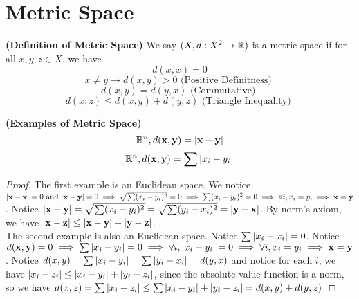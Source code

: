 \documentclass{report}
\begin{document}
\section{Metric Space}
\begin{definition}
\label{2.7.1}
\textbf{(Definition of Metric Space)} We say $(X,d:X^2\rightarrow \mathbb{R})$ is a metric space if for all $x,y,z \in X$, we have
\begin{equation}
d(x,x)=0 
\end{equation}
\begin{equation}
x\neq y\longrightarrow d(x,y)>0\text{ (Positive Definitness) }
\end{equation}
\begin{equation}
d(x,y)=d(y,x)\text{ (Commutative) }
\end{equation}
\begin{equation}
d(x,z)\leq d(x,y)+d(y,z)\text{ (Triangle Inequality) }
\end{equation}
\end{definition}
\begin{theorem}
\label{2.7.2}
\textbf{(Examples of Metric Space)} 
\begin{equation}
  \mathbb{R}^n,d(\textbf{x},\textbf{y})=|\textbf{x}-\textbf{y}|
\end{equation}
\begin{equation}
  \mathbb{R}^n,d(\textbf{x},\textbf{y})=\sum |x_i-y_i|
\end{equation}
\end{theorem}
\begin{proof}
  The first example is an Euclidean space. We notice $|\textbf{x}-\textbf{x}|=0\text{ and }|\textbf{x}-\textbf{y}|=0\implies \sqrt{\sum (x_i-y_i)^2}=0\implies \sum (x_i-y_i)^2=0\implies \forall i, x_i=y_i\implies \textbf{x}=\textbf{y} $. Notice $|\textbf{x}-\textbf{y}|=\sqrt{\sum (x_i-y_i)^2}=\sqrt{\sum (y_i-x_i)^2}=|\textbf{y}-\textbf{x}|$. By norm's axiom, we have $|\textbf{x}-\textbf{z}|\leq |\textbf{x}-\textbf{y}|+|\textbf{y}-\textbf{z}|$.\\

The second example is also an Euclidean space. Notice $\sum |x_i-x_i|=0$. Notice $d(\textbf{x},\textbf{y})=0\implies \sum |x_i-y_i|=0\implies \forall i,|x_i-y_i|=0\implies \forall i,x_i=y_i\implies \textbf{x}=\textbf{y}$. Notice $d(x,y)=\sum |x_i-y_i|=\sum |y_i-x_i|=d(y,x)$ and notice for each  $i$, we have  $|x_i-z_i|\leq |x_i-y_i|+|y_i-z_i|$, since the absolute value function is a norm, so we have $d(x,z)=\sum |x_i-z_i|\leq \sum |x_i-y_i|+|y_i-z_i|=d(x,y)+d(y,z)$
\end{proof}
\end{document}
